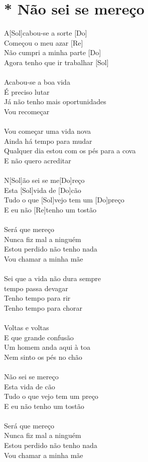 \documentclass{article}
\begin{document}
\section{ * Não sei se mereço}
A[Sol]cabou-se a sorte [Do]\\
Começou o meu azar [Re]\\
Não cumpri a minha parte [Do]\\
Agora tenho que ir trabalhar [Sol]\\
\\
Acabou-se a boa vida\\
É preciso lutar\\
Já não tenho mais oportunidades\\
Vou recomeçar\\
\\
Vou começar uma vida nova\\
Ainda há tempo para mudar\\
Qualquer dia estou com os pés para a cova\\
E não quero acreditar\\
\\
N[Sol]ão sei se me[Do]reço\\
Esta [Sol]vida de [Do]cão\\
Tudo o que [Sol]vejo tem um [Do]preço\\
E eu não [Re]tenho um tostão\\
\\
Será que mereço\\
Nunca fiz mal a ninguém\\
Estou perdido não tenho nada\\
Vou chamar a minha mãe\\
\\
Sei que a vida não dura sempre\\
tempo passa devagar\\
Tenho tempo para rir\\
Tenho tempo para chorar\\
\\
Voltas e voltas\\
E que grande confusão\\
Um homem anda aqui à toa\\
Nem sinto os pés no chão\\
\\
Não sei se mereço\\
Esta vida de cão\\
Tudo o que vejo tem um preço\\
E eu não tenho um tostão\\
\\
Será que mereço\\
Nunca fiz mal a ninguém\\
Estou perdido não tenho nada\\
Vou chamar a minha mãe\\
\end{document}
